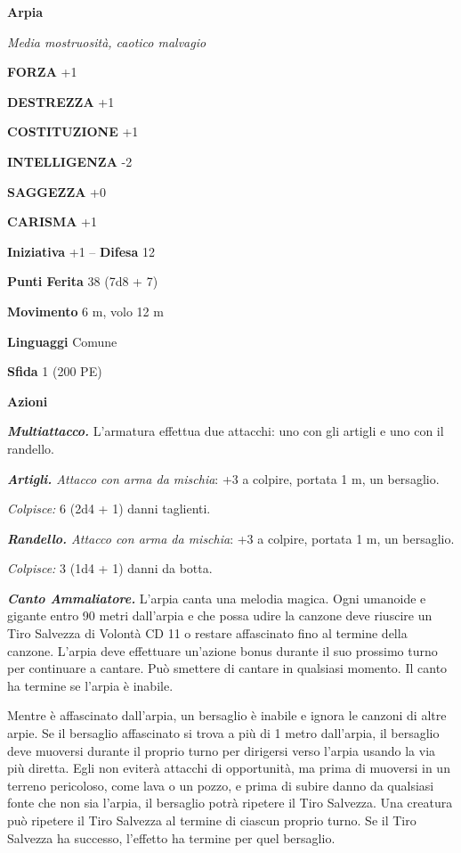 \begin{multicols}{2}
\medskip{}\textbf{Arpia}

\emph{Media mostruosità, caotico malvagio}

\textbf{FORZA} +1

\textbf{DESTREZZA} +1

\textbf{COSTITUZIONE} +1

\textbf{INTELLIGENZA} -2

\textbf{SAGGEZZA} +0

\textbf{CARISMA} +1

\textbf{Iniziativa} +1 -- \textbf{Difesa} 12

\textbf{Punti Ferita} 38 (7d8 + 7)

\textbf{Movimento} 6 m, volo 12 m

\textbf{Linguaggi} Comune

\textbf{Sfida} 1 (200 PE)

\textbf{Azioni}

\emph{\textbf{Multiattacco.}} L'armatura effettua due attacchi: uno con gli artigli e uno con il randello.

\emph{\textbf{Artigli.} Attacco con arma da mischia}: +3 a colpire, portata 1 m, un bersaglio.

\emph{Colpisce:} 6 (2d4 + 1) danni taglienti.

\emph{\textbf{Randello.} Attacco con arma da mischia}: +3 a colpire, portata 1 m, un bersaglio.

\emph{Colpisce:} 3 (1d4 + 1) danni da botta.

\emph{\textbf{Canto Ammaliatore.}} L'arpia canta una melodia magica. Ogni umanoide e gigante entro 90 metri dall'arpia e che possa udire la canzone deve riuscire un Tiro Salvezza di Volontà CD 11 o restare affascinato fino al termine della canzone. L'arpia deve effettuare un'azione bonus durante il suo prossimo turno per continuare a cantare. Può smettere di cantare in qualsiasi momento. Il canto ha termine se l'arpia è inabile.

Mentre è affascinato dall'arpia, un bersaglio è inabile e ignora le canzoni di altre arpie. Se il bersaglio affascinato si trova a più di 1 metro dall'arpia, il bersaglio deve muoversi durante il proprio turno per dirigersi verso l'arpia usando la via più diretta. Egli non eviterà attacchi di opportunità, ma prima di muoversi in un terreno pericoloso, come lava o un pozzo, e prima di subire danno da qualsiasi fonte che non sia l'arpia, il bersaglio potrà ripetere il Tiro Salvezza. Una creatura può ripetere il Tiro Salvezza al termine di ciascun proprio turno. Se il Tiro Salvezza ha successo, l'effetto ha termine per quel bersaglio.


\end{multicols}
